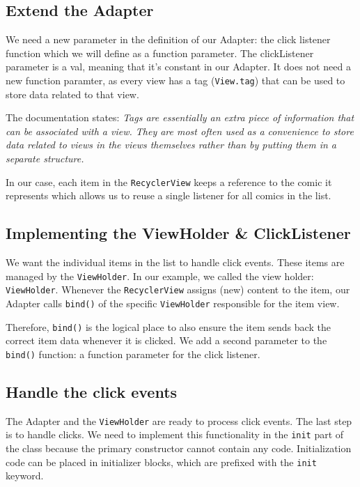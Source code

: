 \subsection*{Extend the Adapter}
We  need a new  parameter in the definition of our Adapter: the click listener function which we will define as a  function parameter.
The clickListener parameter is a val, meaning that it’s constant in our Adapter.
It does not need a new function paramter, as every view has a tag (\lstinline|View.tag|) that can be used to store data related to that view.

The documentation states: \textit{Tags are essentially an extra piece of information that can be associated with a view.
They are most often used as a convenience to store data related to views in the views themselves rather than by putting them in a separate structure.}

In our case, each item in the \lstinline|RecyclerView| keeps a reference to the comic it represents which  allows us to reuse a single listener for all comics in the list.

	

\subsection*{Implementing the ViewHolder \& ClickListener}
We want the individual items in the list to handle click events.
These items are managed by the \lstinline|ViewHolder|.
In our example, we called the view holder: \lstinline|ViewHolder|.
Whenever the \lstinline|RecyclerView| assigns (new) content to the item, our Adapter calls \lstinline|bind()| of the specific \lstinline|ViewHolder| responsible for the item view.

Therefore, \lstinline|bind()| is the logical place to also ensure the item sends back the correct item data whenever it is clicked.
We add a second parameter to the  \lstinline|bind()| function: a function parameter for the click listener.



\subsection*{Handle the click events}
The Adapter and the \lstinline|ViewHolder| are ready to process click events.
The last step is to handle clicks.
We need to implement this functionality in the  \lstinline|init| part of the class because the primary constructor cannot contain any code.
Initialization code can be placed in initializer blocks, which are prefixed with the \lstinline|init| keyword.

